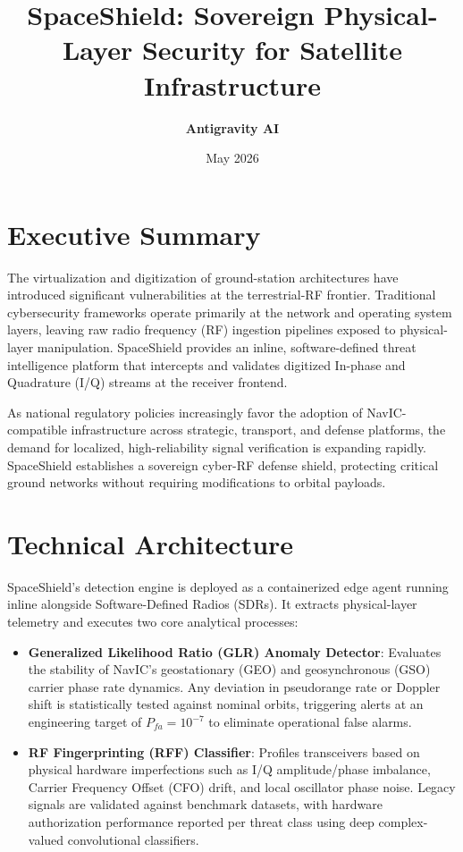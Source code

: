 \documentclass[11pt,a4paper]{article}
\title{\textbf{SpaceShield: Sovereign Physical-Layer Security for Satellite Infrastructure}}
\author{\textbf{Antigravity AI}}
\date{May 2026}
\begin{document}
\maketitle

\section*{Executive Summary}
The virtualization and digitization of ground-station architectures have introduced significant vulnerabilities at the terrestrial-RF frontier. Traditional cybersecurity frameworks operate primarily at the network and operating system layers, leaving raw radio frequency (RF) ingestion pipelines exposed to physical-layer manipulation. SpaceShield provides an inline, software-defined threat intelligence platform that intercepts and validates digitized In-phase and Quadrature (I/Q) streams at the receiver frontend. 

As national regulatory policies increasingly favor the adoption of NavIC-compatible infrastructure across strategic, transport, and defense platforms, the demand for localized, high-reliability signal verification is expanding rapidly. SpaceShield establishes a sovereign cyber-RF defense shield, protecting critical ground networks without requiring modifications to orbital payloads.

\section*{Technical Architecture}
SpaceShield's detection engine is deployed as a containerized edge agent running inline alongside Software-Defined Radios (SDRs). It extracts physical-layer telemetry and executes two core analytical processes:

\begin{tcolorbox}[colback=blue!5!white,colframe=blue!75!black,title=\textbf{Core Technical Innovations}]
\begin{itemize}
    \item \textbf{Generalized Likelihood Ratio (GLR) Anomaly Detector}: Evaluates the stability of NavIC's geostationary (GEO) and geosynchronous (GSO) carrier phase rate dynamics. Any deviation in pseudorange rate or Doppler shift is statistically tested against nominal orbits, triggering alerts at an engineering target of $P_{fa} = 10^{-7}$ to eliminate operational false alarms.
    \item \textbf{RF Fingerprinting (RFF) Classifier}: Profiles transceivers based on physical hardware imperfections such as I/Q amplitude/phase imbalance, Carrier Frequency Offset (CFO) drift, and local oscillator phase noise. Legacy signals are validated against benchmark datasets, with hardware authorization performance reported per threat class using deep complex-valued convolutional classifiers.
\end{itemize}
\end{tcolorbox}
\end{document}
